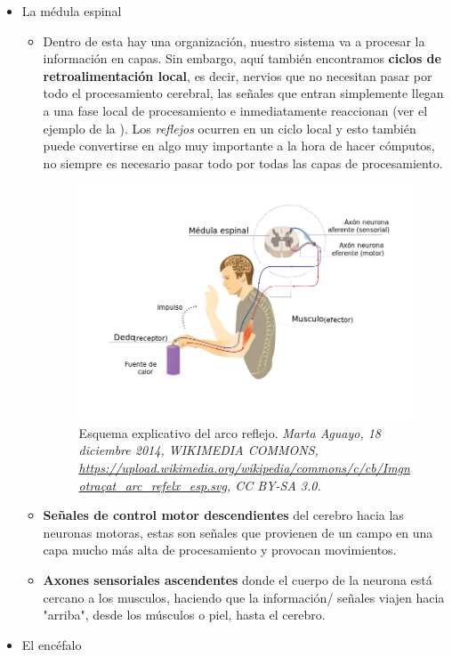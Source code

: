 \begin{itemize}
 \item La médula espinal
    \begin{itemize}
     \item Dentro de esta hay una organización, nuestro sistema va a procesar la información en capas.  Sin embargo, aquí también encontramos \textbf{ciclos de retroalimentación local}, es decir, nervios que no necesitan pasar por todo el procesamiento cerebral, las señales que entran simplemente llegan a una fase local de procesamiento e inmediatamente reaccionan (ver el ejemplo de la ). Los \emph{reflejos} ocurren en un ciclo local y esto también puede convertirse en algo muy importante a la hora de hacer cómputos, no siempre es necesario pasar todo por todas las capas de procesamiento. 


     \begin{figure}[h]
      \centering
      \includegraphics[scale=0.4]{../Figuras/actReflejo.png}
      \caption{ Esquema explicativo del arco reflejo.  \textit{Marta Aguayo, 18 diciembre 2014, WIKIMEDIA COMMONS, \url{https://upload.wikimedia.org/wikipedia/commons/c/cb/Imgnotraçat_arc_refelx_esp.svg}, CC BY-SA 3.0.}}
      \label{actReflejo}
     \end{figure}


     \item \textbf{Señales de control motor descendientes} del cerebro hacia las neuronas motoras, estas son señales que provienen de un campo en una capa mucho más alta de procesamiento y provocan movimientos.
     
     \item \textbf{Axones sensoriales ascendentes} donde el cuerpo de la neurona está cercano a los musculos, haciendo que la información/ señales viajen hacia "arriba", desde los músculos o piel, hasta  el cerebro.  

     \end{itemize}


 \item El encéfalo
\end{itemize}


